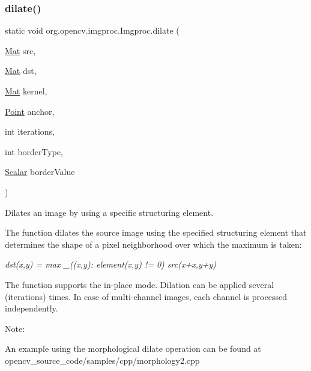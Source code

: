 \subsubsection{\texorpdfstring{dilate()}{dilate()}\hspace{0.1cm}{\footnotesize\ttfamily [1/3]}}
{\footnotesize\ttfamily static void org.\+opencv.\+imgproc.\+Imgproc.\+dilate (\begin{DoxyParamCaption}\item[{\mbox{\hyperlink{classorg_1_1opencv_1_1core_1_1_mat}{Mat}}}]{src,  }\item[{\mbox{\hyperlink{classorg_1_1opencv_1_1core_1_1_mat}{Mat}}}]{dst,  }\item[{\mbox{\hyperlink{classorg_1_1opencv_1_1core_1_1_mat}{Mat}}}]{kernel,  }\item[{\mbox{\hyperlink{classorg_1_1opencv_1_1core_1_1_point}{Point}}}]{anchor,  }\item[{int}]{iterations,  }\item[{int}]{border\+Type,  }\item[{\mbox{\hyperlink{classorg_1_1opencv_1_1core_1_1_scalar}{Scalar}}}]{border\+Value }\end{DoxyParamCaption})\hspace{0.3cm}{\ttfamily [static]}}

Dilates an image by using a specific structuring element.

The function dilates the source image using the specified structuring element that determines the shape of a pixel neighborhood over which the maximum is taken\+:

{\itshape dst(x,y) = max \+\_\+((x\textquotesingle{},y\textquotesingle{})\+: element(x\textquotesingle{},y\textquotesingle{}) != 0) src(x+x\textquotesingle{},y+y\textquotesingle{})}

The function supports the in-\/place mode. Dilation can be applied several ({\ttfamily iterations}) times. In case of multi-\/channel images, each channel is processed independently.

Note\+:


\begin{DoxyItemize}
\item An example using the morphological dilate operation can be found at opencv\+\_\+source\+\_\+code/samples/cpp/morphology2.\+cpp 
\end{DoxyItemize}


